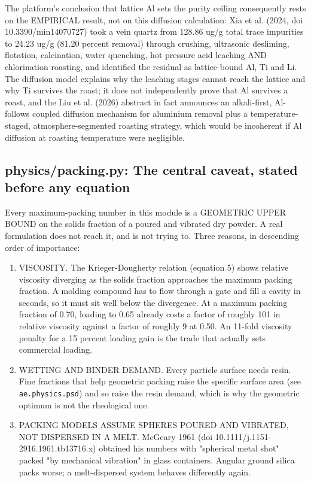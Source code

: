 \documentclass[10pt,a4paper,twoside]{report}
\begin{document}
The platform's conclusion that lattice Al sets the purity ceiling consequently rests on the EMPIRICAL result, not on this diffusion calculation: Xia et al. (2024, doi 10.3390/min14070727) took a vein quartz from 128.86 ug/g total trace impurities to 24.23 ug/g (81.20 percent removal) through crushing, ultrasonic desliming, flotation, calcination, water quenching, hot pressure acid leaching AND chlorination roasting, and identified the residual as lattice-bound Al, Ti and Li. The diffusion model explains why the leaching stages cannot reach the lattice and why Ti survives the roast; it does not independently prove that Al survives a roast, and the Liu et al. (2026) abstract in fact announces an alkali-first, Al-follows coupled diffusion mechanism for aluminium removal plus a temperature-staged, atmosphere-segmented roasting strategy, which would be incoherent if Al diffusion at roasting temperature were negligible.

\subsection{physics/packing.py: The central caveat, stated before any equation}

Every maximum-packing number in this module is a GEOMETRIC UPPER BOUND on the solids fraction of a poured and vibrated dry powder. A real formulation does not reach it, and is not trying to. Three reasons, in descending order of importance:

\begin{enumerate}[leftmargin=*,label=\arabic*.]
\item VISCOSITY. The Krieger-Dougherty relation (equation 5) shows relative viscosity diverging as the solids fraction approaches the maximum packing fraction. A molding compound has to flow through a gate and fill a cavity in seconds, so it must sit well below the divergence. At a maximum packing fraction of 0.70, loading to 0.65 already costs a factor of roughly 101 in relative viscosity against a factor of roughly 9 at 0.50. An 11-fold viscosity penalty for a 15 percent loading gain is the trade that actually sets commercial loading.
\item WETTING AND BINDER DEMAND. Every particle surface needs resin. Fine fractions that help geometric packing raise the specific surface area (see \texttt{ae.physics.psd}) and so raise the resin demand, which is why the geometric optimum is not the rheological one.
\item PACKING MODELS ASSUME SPHERES POURED AND VIBRATED, NOT DISPERSED IN A MELT. McGeary 1961 (doi 10.1111/j.1151-2916.1961.tb13716.x) obtained his numbers with "spherical metal shot" packed "by mechanical vibration" in glass containers. Angular ground silica packs worse; a melt-dispersed system behaves differently again.
\end{enumerate}
\end{document}
